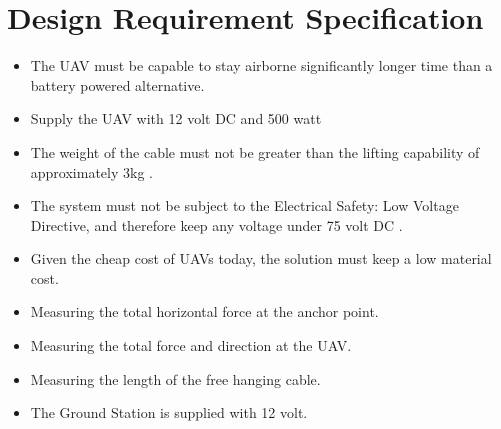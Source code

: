 \section{Design Requirement Specification}
\begin{itemize}
\item The UAV must be capable to stay airborne significantly longer time than a battery powered alternative.
\item Supply the UAV with 12 volt DC and 500 watt
\item The weight of the cable must not be greater than the lifting capability of approximately 3kg \cite{Sidea2013}.
\item The system must not be subject to the Electrical Safety: Low Voltage Directive, and therefore keep any voltage under 75 volt DC \cite{Parliament2006}.
\item Given the cheap cost of UAVs today, the solution must keep a low material cost.
\item Measuring the total horizontal force at the anchor point.
\item Measuring the total force and direction at the UAV.
\item Measuring the length of the free hanging cable.
\item The Ground Station is supplied with 12 volt.
\end{itemize}





